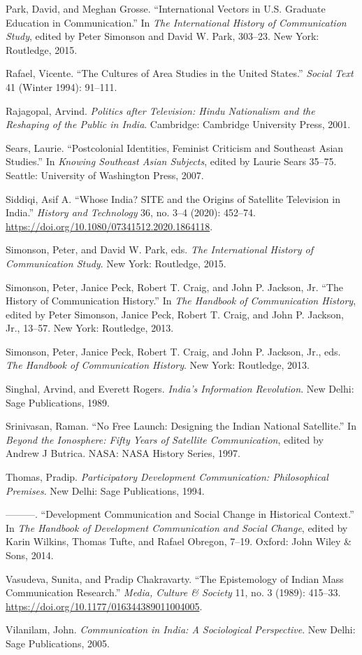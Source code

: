 \documentclass{tufte-handout}
\begin{document}
\begin{hangparas}{.25in}{1}
Park, David, and Meghan Grosse. ``International Vectors in U.S. Graduate
Education in Communication.'' In \emph{The International History of
Communication Study}, edited by Peter Simonson and David W. Park,
303--23. New York: Routledge, 2015.

Rafael, Vicente. ``The Cultures of Area Studies in the United States.''
\emph{Social Text} 41 (Winter 1994): 91--111.

Rajagopal, Arvind. \emph{Politics after Television: Hindu Nationalism
and the Reshaping of the Public in India}. Cambridge: Cambridge
University Press, 2001.

Sears, Laurie. ``Postcolonial Identities, Feminist Criticism and
Southeast Asian Studies.'' In \emph{Knowing Southeast Asian Subjects},
edited by Laurie Sears 35--75. Seattle: University of Washington Press,
2007.

Siddiqi, Asif A. ``Whose India? SITE and the Origins of Satellite
Television in India.'' \emph{History and Technology} 36, no. 3--4
(2020): 452--74. \url{https://doi.org/10.1080/07341512.2020.1864118}.

Simonson, Peter, and David W. Park, eds. \emph{The International History
of Communication Study}. New York: Routledge, 2015.

Simonson, Peter, Janice Peck, Robert T. Craig, and John P. Jackson, Jr.
``The History of Communication History.'' In \emph{The Handbook of
Communication History}, edited by Peter Simonson, Janice Peck, Robert T.
Craig, and John P. Jackson, Jr., 13--57. New York: Routledge, 2013.

Simonson, Peter, Janice Peck, Robert T. Craig, and John P. Jackson, Jr.,
eds. \emph{The Handbook of Communication History}. New York: Routledge,
2013.

Singhal, Arvind, and Everett Rogers. \emph{India's Information
Revolution}. New Delhi: Sage Publications, 1989.

Srinivasan, Raman. ``No Free Launch: Designing the Indian National
Satellite.'' In \emph{Beyond the Ionosphere: Fifty Years of Satellite
Communication}, edited by Andrew J Butrica. NASA: NASA History Series,
1997.

Thomas, Pradip. \emph{Participatory Development Communication:
Philosophical Premises}. New Delhi: Sage Publications, 1994.

---------. ``Development Communication and Social Change in Historical
Context.'' In \emph{The Handbook of Development Communication and Social
Change}, edited by Karin Wilkins, Thomas Tufte, and Rafael Obregon,
7--19. Oxford: John Wiley \& Sons, 2014.

Vasudeva, Sunita, and Pradip Chakravarty. ``The Epistemology of Indian
Mass Communication Research.'' \emph{Media, Culture \& Society} 11, no.
3 (1989): 415--33. \url{https://doi.org/10.1177/016344389011004005}.

Vilanilam, John. \emph{Communication in India: A Sociological
Perspective}. New Delhi: Sage Publications, 2005.



\end{hangparas}
\end{document}
